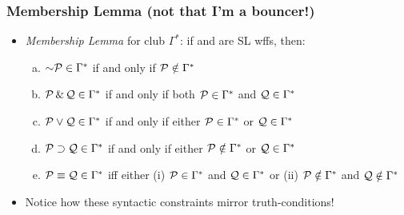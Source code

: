 \begin{frame}
\frametitle{Membership Lemma (not that I'm a bouncer!)}

\begin{itemize}[<+->]

\item \emph{Membership Lemma} for club $\Gamma^{\ast}$: if  and  are SL wffs, then:

\begin{enumerate}[a.)]

\item $\enot \metav{P} \in \Gamma^{\ast}$ if and only if $\mathcal{P} \notin \Gamma^{\ast}$

\item $\mathcal{P} \,\&\, \mathcal{Q} \in \Gamma^{\ast}$ if and only if both $\mathcal{P}\in \Gamma^{\ast}$ and $\mathcal{Q}\in \Gamma^{\ast}$

\item $\mathcal{P} \vee \mathcal{Q} \in \Gamma^{\ast}$ if and only if either $\mathcal{P}\in \Gamma^{\ast}$ or $\mathcal{Q}\in \Gamma^{\ast}$

\item $\mathcal{P} \supset \mathcal{Q} \in \Gamma^{\ast}$ if and only if either $\mathcal{P}\notin \Gamma^{\ast}$ or $\mathcal{Q}\in \Gamma^{\ast}$

\item $\mathcal{P} \equiv \mathcal{Q} \in \Gamma^{\ast}$ iff either (i) $\mathcal{P}\in \Gamma^{\ast}$ and $\mathcal{Q}\in \Gamma^{\ast}$ or (ii) $\mathcal{P}\notin \Gamma^{\ast}$ and $\mathcal{Q}\notin \Gamma^{\ast}$

\end{enumerate}

\item Notice how these syntactic constraints mirror truth-conditions!

\end{itemize}
\end{frame}

